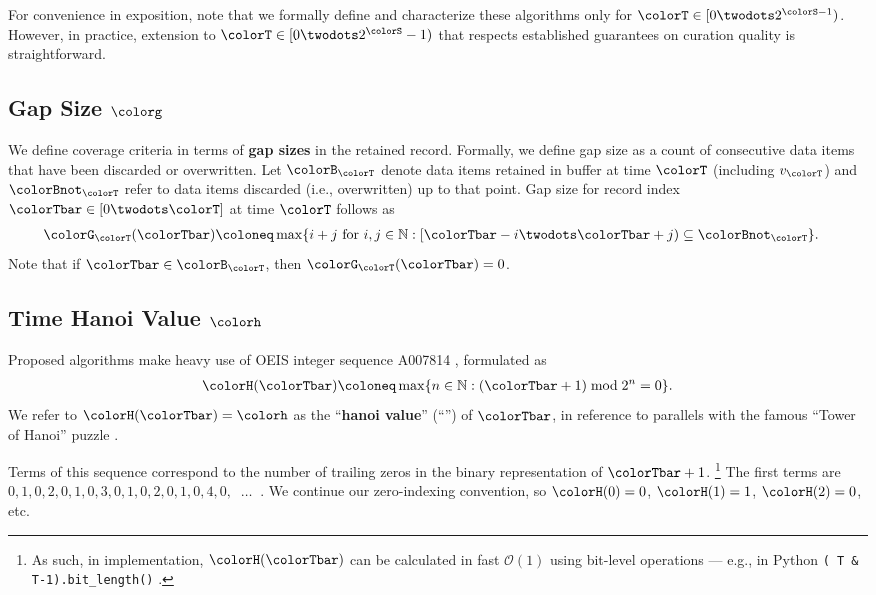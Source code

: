 For convenience in exposition, note that we formally define and characterize these algorithms only for $\colorT \in [0 \twodots 2^{\colorS - 1})$.
However, in practice, extension to $\colorT \in [0 \twodots 2^{\colorS} - 1)$ that respects established guarantees on curation quality is straightforward.

\subsection{Gap Size $\colorg$}
\label{sec:notation-gapsize}

We define coverage criteria in terms of \textbf{gap sizes} in the retained record.
Formally, we define gap size as a count of consecutive data items that have been discarded or overwritten.
Let $\colorB_{\colorT}$ denote data items retained in buffer at time $\colorT$ (including $v_{\colorT}$) and $\colorBnot_{\colorT}$ refer to data items discarded (i.e., overwritten) up to that point.
Gap size for record index $\colorTbar \in [0 \twodots \colorT]$ at time $\colorT$ follows as
\begin{align}
\colorG_{\colorT}(\colorTbar)
&\coloneq
\max
\{
  i + j
  \text{ for }
  i, j \in \mathbb{N}
  :
  [\colorTbar-i \twodots \colorTbar+j) \subseteq \colorBnot_{\colorT}
\}.
\label{eqn:gap-size-defn}
\end{align}
Note that if $\colorTbar \in \colorB_{\colorT}$, then $\colorG_{\colorT}(\colorTbar) = 0$.

\subsection{Time Hanoi Value $\colorh$}
\label{sec:notation-hanoi}

Proposed algorithms make heavy use of OEIS integer sequence A007814 \citep{oeis}, formulated as
\begin{align}
\colorH(\colorTbar)
\coloneq
\max \{ n \in \mathbb{N} : (\colorTbar + 1) \bmod 2^n = 0 \}.
\label{eqn:hanoi-defn}
\end{align}
We refer to $\colorH(\colorTbar) = \colorh$ as the ``\textbf{hanoi value}'' (``\textbf{\hv{}}'') of $\colorTbar$, in reference to parallels with the famous ``Tower of Hanoi'' puzzle \citep{lucas1889jeux}.

Terms of this sequence correspond to the number of trailing zeros in the binary representation of $\colorTbar + 1$.%
\footnote{%
As such, in implementation, $\colorH(\colorTbar)$ can be calculated in fast $\mathcal{O}(1)$ using bit-level operations --- e.g., in Python \texttt{(~T \& T-1).bit\_length()} \citep{oeis}.
}
The first terms are $0,\allowbreak 1,\allowbreak 0,\allowbreak 2,\allowbreak 0,\allowbreak 1,\allowbreak 0,\allowbreak 3,\allowbreak 0,\allowbreak 1,\allowbreak 0,\allowbreak 2,\allowbreak 0,\allowbreak 1,\allowbreak 0,\allowbreak 4,\allowbreak 0,\allowbreak \;\;\ldots \;\;$.
We continue our zero-indexing convention, so $\colorH(0) = 0$, $\colorH(1) = 1$, $\colorH(2) = 0$, etc.

